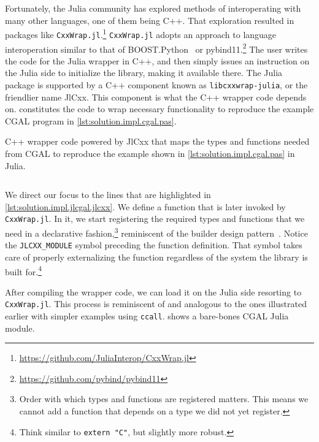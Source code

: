 Fortunately, the Julia community has explored methods of interoperating with
many other languages, one of them being C++.  That exploration resulted in
packages like 
\texttt{CxxWrap.jl}.\footnote{\url{https://github.com/JuliaInterop/CxxWrap.jl}}
\texttt{CxxWrap.jl} adopts an approach to language interoperation similar to
that of BOOST.Python~\cite{Abrahams:2003:BHSBP} or
pybind11.\footnote{\url{https://github.com/pybind/pybind11}}  The user writes
the code for the Julia wrapper in C++, and then simply issues an instruction on
the Julia side to initialize the library, making it available there.  The Julia
package is supported by a C++ component known as \texttt{libcxxwrap-julia}, or
the friendlier name JlCxx. This component is what the C++ wrapper code depends
on.   constitutes the code to wrap
necessary functionality to reproduce the example \ac{CGAL} program in
\cref{lst:solution.impl.cgal.pas}.

\begin{listing}[htbp]
  \caption[Wrapper CxxWrap code for Three points and one segment]{
    C++ wrapper code powered by JlCxx that maps the types and functions needed
    from \acs{CGAL} to reproduce the example shown in
    \cref{lst:solution.impl.cgal.pas} in Julia.}%
  \label{lst:solution.impl.jlcgal.jlcxx}
  \inputminted[fontsize=\small]{cpp}{cpp/cgal_julia.cpp}
\end{listing}

We direct our focus to the lines that are highlighted in
\cref{lst:solution.impl.jlcgal.jlcxx}.  We define a function that is later
invoked by \texttt{CxxWrap.jl}.  In it, we start registering the required types
and functions that we need in a declarative fashion,\footnote{Order with which
types and functions are registered matters.  This means we cannot add a function
that depends on a type we did not yet register.} reminiscent of the builder
design pattern~\cite{GOF:1994:DPEROOS}.  Notice the \texttt{JLCXX\_MODULE}
symbol preceding the function definition.  That symbol takes care of properly
externalizing the function regardless of the system the library is built
for.\footnote{Think similar to \texttt{extern "C"}, but slightly more
robust.}

After compiling the wrapper code, we can load it on the Julia side resorting to
\texttt{CxxWrap.jl}.  This process is reminiscent of and analogous to the ones
illustrated earlier with simpler examples using \texttt{ccall}.
 shows a bare-bones CGAL Julia module.

